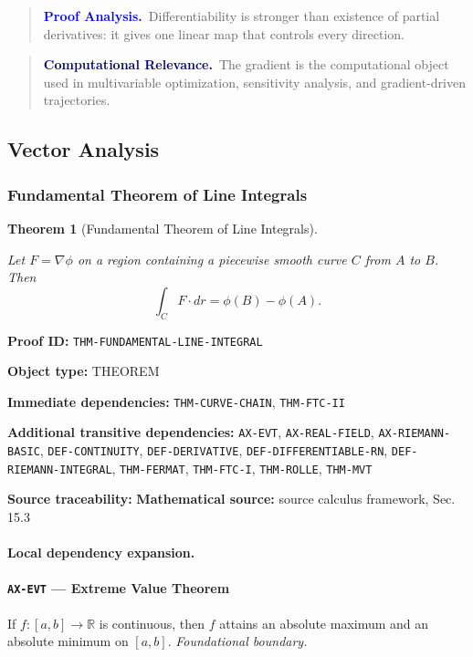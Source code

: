 \documentclass[10pt]{article}
\newcommand{\pidraw}[1]{\begingroup\urlstyle{tt}\nolinkurl{#1}\endgroup}
\newtheorem{theorem}{Theorem}[section]
\theoremstyle{definition}
\theoremstyle{remark}
\newenvironment{proofanalysis}
{\begin{quote}\small\noindent\textbf{\textcolor{blue}{Proof Analysis.}}\ }
{\end{quote}}
\newenvironment{computationalrelevance}
{\begin{quote}\small\noindent\textbf{\textcolor{navy}{Computational Relevance.}}\ }
{\end{quote}}
\newcommand{\meta}[2]{\noindent\textbf{#1:} #2\par}
\begin{document}
\begin{proofanalysis}Differentiability is stronger than existence of partial derivatives: it gives one linear map that controls every direction.\end{proofanalysis}

\begin{computationalrelevance}The gradient is the computational object used in multivariable optimization, sensitivity analysis, and gradient-driven trajectories.\end{computationalrelevance}

\subsection{Vector Analysis}

\subsubsection{Fundamental Theorem of Line Integrals}

\begin{theorem}[Fundamental Theorem of Line Integrals]\label{prf:THM-FUNDAMENTAL-LINE-INTEGRAL}

Let $F=\nabla\phi$ on a region containing a piecewise smooth curve $C$ from $A$ to $B$. Then
\[
\int_C F\cdot dr=\phi(B)-\phi(A).
\]

\end{theorem}

\meta{Proof ID}{\pidraw{THM-FUNDAMENTAL-LINE-INTEGRAL}}
\meta{Object type}{THEOREM}
\meta{Immediate dependencies}{\pidraw{THM-CURVE-CHAIN}, \pidraw{THM-FTC-II}}
\meta{Additional transitive dependencies}{\pidraw{AX-EVT}, \pidraw{AX-REAL-FIELD}, \pidraw{AX-RIEMANN-BASIC}, \pidraw{DEF-CONTINUITY}, \pidraw{DEF-DERIVATIVE}, \pidraw{DEF-DIFFERENTIABLE-RN}, \pidraw{DEF-RIEMANN-INTEGRAL}, \pidraw{THM-FERMAT}, \pidraw{THM-FTC-I}, \pidraw{THM-ROLLE}, \pidraw{THM-MVT}}
\meta{Source traceability}{\textbf{Mathematical source:} source calculus framework, Sec. 15.3}

\paragraph{Local dependency expansion.}

\paragraph{\pidraw{AX-EVT} --- Extreme Value Theorem}
If $f:[a,b]\to\mathbb{R}$ is continuous, then $f$ attains an absolute maximum and an absolute minimum on $[a,b]$.
\textit{Foundational boundary.}
\end{document}
